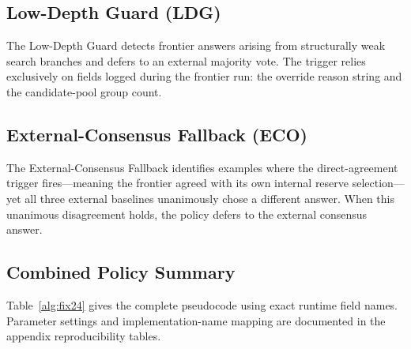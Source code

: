 \subsection{Low-Depth Guard (LDG)}
\label{sec:fix2}

The Low-Depth Guard detects frontier answers arising from structurally weak search branches and defers to an external majority vote. The trigger relies exclusively on fields logged during the frontier run: the override reason string and the candidate-pool group count.

\subsection{External-Consensus Fallback (ECO)}
\label{sec:fix4}

The External-Consensus Fallback identifies examples where the direct-agreement trigger fires---meaning the frontier agreed with its own internal reserve selection---yet all three external baselines unanimously chose a different answer. When this unanimous disagreement holds, the policy defers to the external consensus answer.

\subsection{Combined Policy Summary}
\label{sec:fix24_algorithm}

Table~\ref{alg:fix24} gives the complete pseudocode using exact runtime field names. Parameter settings and implementation-name mapping are documented in the appendix reproducibility tables.

